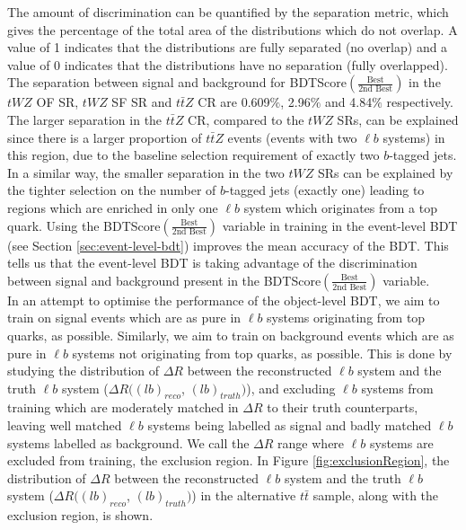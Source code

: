 The amount of discrimination can be quantified by the separation metric, which gives the percentage of the total area of the distributions which do not overlap. A value of 1 indicates that the distributions are fully separated (no overlap) and a value of 0 indicates that the distributions have no separation (fully overlapped). The separation between signal and background for BDTScore$(\frac{\text{Best}}{\text{2nd Best}})$ in the $tWZ$ OF SR, $tWZ$ SF SR and $t\bar{t}Z$ CR are 0.609$\%$, 2.96$\%$ and 4.84$\%$ respectively. The larger separation in the $t\bar{t}Z$ CR, compared to the $tWZ$ SRs, can be explained since there is a larger proportion of $t\bar{t}Z$ events (events with two $\ell b$ systems) in this region, due to the baseline selection requirement of exactly two $b$-tagged jets. In a similar way, the smaller separation in the two $tWZ$ SRs can be explained by the tighter selection on the number of $b$-tagged jets (exactly one) leading to regions which are enriched in only one $\ell b$ system which originates from a top quark. Using the BDTScore$(\frac{\text{Best}}{\text{2nd Best}})$ variable in training in the event-level BDT (see Section \ref{sec:event-level-bdt}) improves the mean accuracy of the BDT. This tells us that the event-level BDT is taking advantage of the discrimination between signal and background present in the BDTScore$(\frac{\text{Best}}{\text{2nd Best}})$ variable.\\

In an attempt to optimise the performance of the object-level BDT, we aim to train on signal events which are as pure in $\ell b$ systems originating from top quarks, as possible. Similarly, we aim to train on background events which are as pure in $\ell b$ systems not originating from top quarks, as possible. This is done by studying the distribution of $\Delta R$ between the reconstructed $\ell b$ system and the truth $\ell b$ system ($\Delta R((lb)_{reco}$, $(lb)_{truth})$), and excluding $\ell b$ systems from training which are moderately matched in $\Delta R$ to their truth counterparts, leaving well matched $\ell b$ systems being labelled as signal and badly matched $\ell b$ systems labelled as background. We call the $\Delta R$ range where $\ell b$ systems are excluded from training, the exclusion region. In Figure \ref{fig:exclusionRegion}, the distribution of $\Delta R$ between the reconstructed $\ell b$ system and the truth $\ell b$ system ($\Delta R((lb)_{reco}$, $(lb)_{truth})$) in the alternative $t\bar{t}$ sample, along with the exclusion region, is shown.

